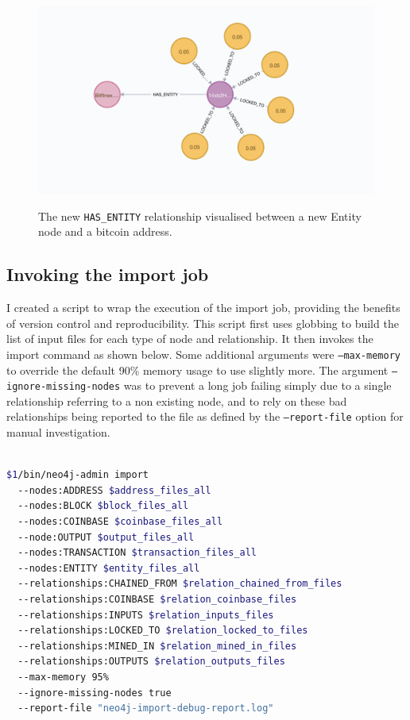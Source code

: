 \begin{figure}[h!]
  \centering
  \includegraphics[width = 15cm]{./figures/has-entity-relationship}\\[0.5cm] 
  \caption{The new \texttt{HAS\_ENTITY} relationship visualised between a new Entity node and a bitcoin address.}
  \label{fig:neo4j-has-entity}
\end{figure}



\subsection{Invoking the import job}
I created a script to wrap the execution of the import job, providing the benefits of version control and reproducibility. This script first uses globbing to build the list of input files for each type of node and relationship. It then invokes the import command as shown below. Some additional arguments were \texttt{--max-memory} to override the default 90\% memory usage to use slightly more. The argument \texttt{--ignore-missing-nodes} was to prevent a long job failing simply due to a single relationship referring to a non existing node, and to rely on these bad relationships being reported to the file as defined by the \texttt{--report-file} option for manual investigation. 
\\\\
\begin{lstlisting}[language=Bash]
$1/bin/neo4j-admin import 
  --nodes:ADDRESS $address_files_all
  --nodes:BLOCK $block_files_all
  --nodes:COINBASE $coinbase_files_all
  --node:OUTPUT $output_files_all
  --nodes:TRANSACTION $transaction_files_all 
  --nodes:ENTITY $entity_files_all
  --relationships:CHAINED_FROM $relation_chained_from_files 
  --relationships:COINBASE $relation_coinbase_files 
  --relationships:INPUTS $relation_inputs_files 
  --relationships:LOCKED_TO $relation_locked_to_files 
  --relationships:MINED_IN $relation_mined_in_files 
  --relationships:OUTPUTS $relation_outputs_files 
  --max-memory 95% 
  --ignore-missing-nodes true 
  --report-file "neo4j-import-debug-report.log" 
\end{lstlisting}

